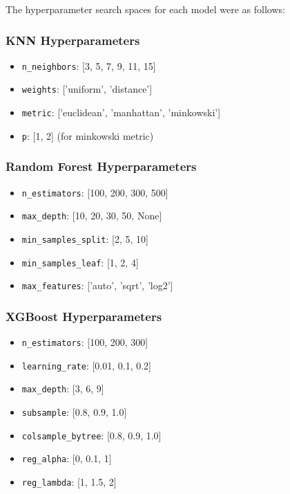 \documentclass[12pt]{article}
\begin{document}
The hyperparameter search spaces for each model were as follows:

\subsubsection{KNN Hyperparameters}
\begin{itemize}
    \item \texttt{n\_neighbors}: [3, 5, 7, 9, 11, 15]
    \item \texttt{weights}: ['uniform', 'distance']
    \item \texttt{metric}: ['euclidean', 'manhattan', 'minkowski']
    \item \texttt{p}: [1, 2] (for minkowski metric)
\end{itemize}

\subsubsection{Random Forest Hyperparameters}
\begin{itemize}
    \item \texttt{n\_estimators}: [100, 200, 300, 500]
    \item \texttt{max\_depth}: [10, 20, 30, 50, None]
    \item \texttt{min\_samples\_split}: [2, 5, 10]
    \item \texttt{min\_samples\_leaf}: [1, 2, 4]
    \item \texttt{max\_features}: ['auto', 'sqrt', 'log2']
\end{itemize}

\subsubsection{XGBoost Hyperparameters}
\begin{itemize}
    \item \texttt{n\_estimators}: [100, 200, 300]
    \item \texttt{learning\_rate}: [0.01, 0.1, 0.2]
    \item \texttt{max\_depth}: [3, 6, 9]
    \item \texttt{subsample}: [0.8, 0.9, 1.0]
    \item \texttt{colsample\_bytree}: [0.8, 0.9, 1.0]
    \item \texttt{reg\_alpha}: [0, 0.1, 1]
    \item \texttt{reg\_lambda}: [1, 1.5, 2]
\end{itemize}
\end{document}
